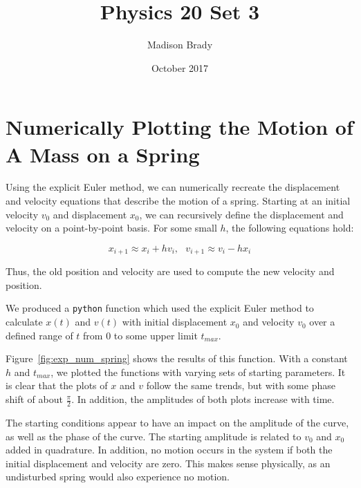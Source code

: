 \documentclass{article}
\title{Physics 20 Set 3}
\author{Madison Brady}
\date{October 2017}
\begin{document}
\maketitle

\section{Numerically Plotting the Motion of A Mass on a Spring}

Using the explicit Euler method, we can numerically recreate the displacement and velocity equations that describe the motion of a spring.  Starting at an initial velocity $v_0$ and displacement $x_0$, we can recursively define the displacement and velocity on a point-by-point basis.  For some small $h$, the following equations hold:

\begin{equation}
    x_{i + 1} \approx x_i + h v_i, ~~~
    v_{i + 1} \approx v_i - h x_i
\end{equation}

Thus, the old position and velocity are used to compute the new velocity and position.

We produced a \texttt{python} function which used the explicit Euler method to calculate $x(t)$ and $v(t)$ with initial displacement $x_0$ and velocity $v_0$ over a defined range of $t$ from $0$ to some upper limit $t_{max}$.

Figure~\ref{fig:exp_num_spring} shows the results of this function.  With a constant $h$ and $t_{max}$, we plotted the functions with varying sets of starting parameters.  It is clear that the plots of $x$ and $v$ follow the same trends, but with some phase shift of about $\frac{\pi}{2}$.  In addition, the amplitudes of both plots increase with time.

The starting conditions appear to have an impact on the amplitude of the curve, as well as the phase of the curve.  The starting amplitude is related to $v_0$ and $x_0$ added in quadrature.  In addition, no motion occurs in the system if both the initial displacement and velocity are zero.  This makes sense physically, as an undisturbed spring would also experience no motion.
\end{document}

